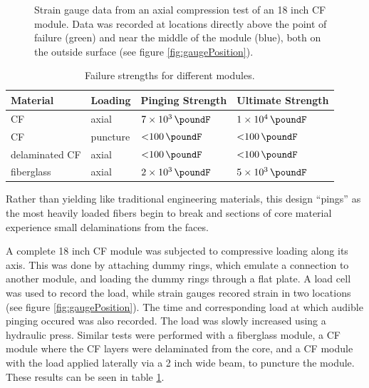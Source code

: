 \documentclass{aiaa-tc}%
\begin{document}
\begin{figure}[t]
{		\caption{
			Positioning of the strain gauges referred to in figure \ref{fig:strain}. 
			The gauges have been circled with colors corresponding to figure \ref{fig:strain}.
			Both are alligned with one of the pillars shown in figures \ref{fig:module} and \ref{fig:crush}.
			The bottom gauge is positioned directly above the point of failure.
			}
		\label{fig:gaugePosition}
	}
	\hfill
	\parbox{0.6\linewidth}
	{
		\centering
		
		\caption{
			Strain gauge data from an axial compression test of an 18 inch CF module. 
			Data was recorded at locations directly above the point of failure (green) 
			and near the middle of the module (blue), both on the outside surface (see figure \ref{fig:gaugePosition}).
			}
		\label{fig:strain}
	}
\end{figure}

\begin{table}
	\centering
	\caption{Failure strengths for different modules.}
	\label{tab:compression}
	\begin{tabular}{llll}
		Material & Loading & Pinging Strength & Ultimate Strength\\
		\hline
		CF 		& axial 	& $\SI{7e3}{\poundF}$ 	& $\SI{1e4}{\poundF}$ \\
		CF 		& puncture 	& $\SI{<100}{\poundF}$	& $\SI{<100}{\poundF}$\\
		delaminated CF 	& axial 	& $\SI{<100}{\poundF}$	& $\SI{<100}{\poundF}$\\
		fiberglass 	& axial 	& $\SI{2e3}{\poundF}$ 	& $\SI{5e3}{\poundF}$ \\
	\end{tabular}
\end{table}

Rather than yielding like traditional engineering materials, this design ``pings'' as the most heavily loaded fibers begin to break and sections of core material experience small delaminations from the faces. 

A complete 18 inch CF module was subjected to compressive loading along its axis. This was done by attaching dummy rings, which emulate a connection to another module, and loading the dummy rings through a flat plate. 
A load cell was used to record the load, while strain gauges recored strain in two locations (see figure \ref{fig:gaugePosition}). 
The time and corresponding load at which audible pinging occured was also recorded.
The load was slowly increased using a hydraulic press. 
Similar tests were performed with a fiberglass module, a CF module where the CF layers were delaminated from the core, and a CF module with the load applied laterally via a 2 inch wide beam, to puncture the module.
These results can be seen in table \ref{tab:compression}.
\end{document}
